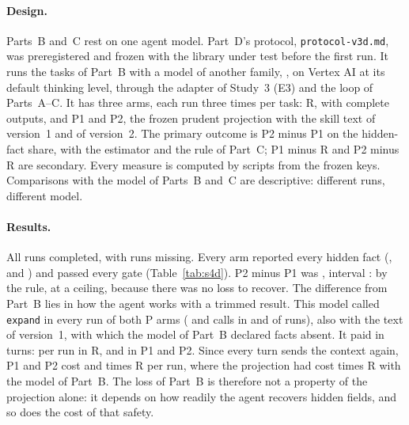 \paragraph{Design.} Parts~B and~C rest on one agent model. Part~D's protocol, \texttt{protocol-v3d.md}, was
preregistered and frozen with the library under test before the first run. It runs the \SfourDTasks{} tasks of
Part~B with a model of another family, \texttt{\SfourDModel}, on Vertex AI at its default thinking level, through the adapter of Study~3 (E3) and the
loop of Parts~A--C. It has three arms, each run three times per task: R, with complete outputs, and P1 and P2, the
frozen prudent projection with the skill text of version~1 and of version~2. The primary outcome is P2 minus P1 on
the hidden-fact share, with the estimator and the rule of Part~C; P1 minus R and P2 minus R are secondary. Every
measure is computed by scripts from the frozen keys. Comparisons with the model of Parts~B and~C are descriptive:
different runs, different model.

\begin{table}[t]
\centering\small

\caption{Study~4D: the tasks of Part~B with \texttt{\SfourDModel}, complete outputs (R) and the frozen projection
with the skill text of version~1 (P1) and~2 (P2), \SfourDRunsPerArm{} runs per arm. Shares averaged within task,
tasks weighted equally.}
\label{tab:s4d}
\end{table}

\paragraph{Results.} All \SfourDRuns{} runs completed, with \SfourDMissing{} runs missing. Every arm reported every
hidden fact (\SfourDHiddenR{}, \SfourDHiddenPone{} and \SfourDHiddenPtwo{}) and passed every gate
(Table~\ref{tab:s4d}). P2 minus P1 was \SfourDPtwoMinusPone{}, interval \SfourDPtwoMinusPoneCI{}: \emph{\SfourDPtwoMinusPoneVerdict}
by the rule, at a ceiling, because there was no loss to recover. The difference from Part~B lies in how the agent
works with a trimmed result. This model called \texttt{expand} in every run of both P arms (\SfourDExpandPone{} and
\SfourDExpandPtwo{} calls in \SfourDExpandRunsPone{} and \SfourDExpandRunsPtwo{} of \SfourDRunsPerArm{} runs), also
with the text of version~1, with which the model of Part~B declared facts absent. It paid in turns: \SfourDTurnsR{}
per run in R, \SfourDTurnsPone{} and \SfourDTurnsPtwo{} in P1 and P2. Since every turn sends the context again, P1
and P2 cost \SfourDCostPone{} and \SfourDCostPtwo{} times R per run, where the projection had cost \SfourBCost{}
times R with the model of Part~B. The loss of Part~B is therefore not a property of the projection alone: it depends
on how readily the agent recovers hidden fields, and so does the cost of that safety.

